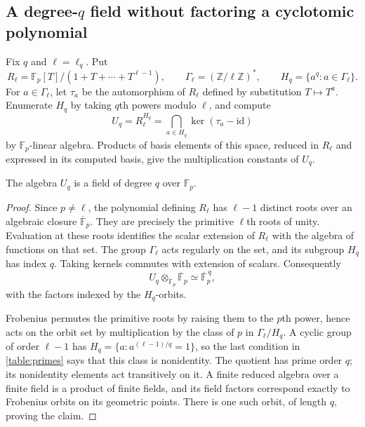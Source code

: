 \subsection{A degree-\texorpdfstring{$q$}{q} field without factoring a cyclotomic polynomial}

Fix $q$ and $\ell=\ell_q$.  Put
\[
 R_\ell=\mathbb F_p[T]/(1+T+\cdots+T^{\ell-1}),\qquad
 \Gamma_\ell=(\mathbb Z/\ell\mathbb Z)^*,\qquad
 H_q=\{a^q:a\in\Gamma_\ell\}.
\]
For $a\in\Gamma_\ell$, let $\tau_a$ be the automorphism of
$R_\ell$ defined by substitution $T\mapsto T^a$.  Enumerate $H_q$ by taking $q$th powers modulo $\ell$,
and compute
\begin{equation}\label{table:invariants}
 U_q=R_\ell^{H_q}
    =\bigcap_{a\in H_q}\ker(\tau_a-\mathrm{id})
\end{equation}
by $\mathbb F_p$-linear algebra.  Products of basis
elements of this space, reduced in $R_\ell$ and expressed in its computed
basis, give the multiplication constants of $U_q$.

\begin{lemma}\label{table:degreeq}
The algebra $U_q$ is a field of degree $q$ over $\mathbb F_p$.
\end{lemma}
\begin{proof}
Since $p\ne\ell$, the polynomial defining $R_\ell$ has $\ell-1$
distinct roots over an algebraic closure $\overline{\mathbb F}_p$.
They are precisely the primitive $\ell$th roots of unity.  Evaluation at
these roots identifies the scalar extension of $R_\ell$ with the algebra
of functions on that set.  The group $\Gamma_\ell$ acts regularly on the
set, and its subgroup $H_q$ has index $q$.  Taking kernels commutes with
extension of scalars.  Consequently
\[
 U_q\otimes_{\mathbb F_p}\overline{\mathbb F}_p
       \simeq\overline{\mathbb F}_p^{\,q},
\]
with the factors indexed by the $H_q$-orbits.

Frobenius permutes the primitive roots by raising them to the $p$th
power, hence acts on the orbit set by multiplication by the class of $p$
in $\Gamma_\ell/H_q$.  A cyclic group of order $\ell-1$ has
$H_q=\{a:a^{(\ell-1)/q}=1\}$, so the last condition in
\eqref{table:primes} says that this class is nonidentity.  The quotient has
prime order $q$; its nonidentity elements act transitively on it.
A finite reduced algebra over a finite field is a product of finite fields,
and its field factors correspond exactly to Frobenius orbits on its
geometric points.  There is one such orbit, of length $q$, proving the
claim.
\end{proof}

